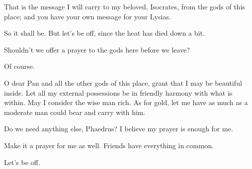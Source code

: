That is the message I will carry to my beloved, Isocrates, from the gods
of this place; and you have your own message for your Lysias.

\sayphaedrus So it shall be. But let’s be off, since the heat has died down
a bit.

\saysocrates Shouldn’t we offer a prayer to the gods here before we leave?

\sayphaedrus Of course.

\saysocrates O dear Pan and all the other gods of this place, grant that I
may be beautiful inside. Let all my external possessions be in friendly 
harmony with what is within. May I consider the wise man rich.
As for gold, let me have as much as a moderate man
could bear and carry with him.

Do we need anything else, Phaedrus? I believe my prayer is enough for
me.

\sayphaedrus Make it a prayer for me as well. Friends have everything in
common.

\saysocrates Let’s be off.
\stopchapter


